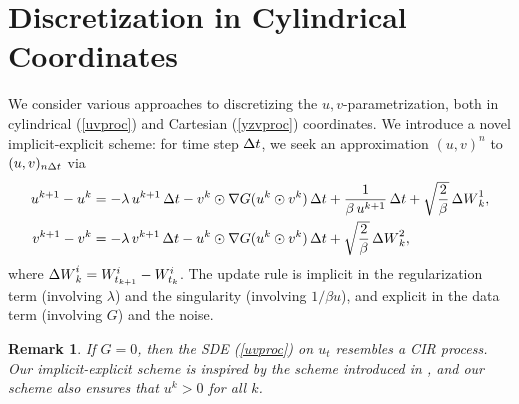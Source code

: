 \documentclass[11pt, twoside]{report}
\newtheorem{remark}{Remark}[theorem]
\begin{document}
\section{Discretization in Cylindrical Coordinates}
We consider various approaches to discretizing the $u,v$-parametrization, both in cylindrical (\ref{uvproc}) and Cartesian (\ref{yzvproc}) coordinates.
We introduce a novel implicit-explicit scheme: for time step ${\Delta t}$, we seek an approximation $(u,v)^n$ to $(u,v)_{n {\Delta t}}$ via
\begin{gather}
\begin{split}
u^{k+1}-u^k&=-\lambda\,   u^{k+1}\,{\Delta t} - v^k \odot\nabla G(u^k \odot v^k)\,
{\Delta t}
 +\frac{1}{\beta\, u^{k+1}}\,{\Delta t}+ \sqrt\frac{2}{\beta} \,{\Delta W}^1_{k},\\
v^{k+1}-v^k&=-\lambda\,  v^{k+1}\,{\Delta t} -  u^k\odot \nabla G(u^k \odot v^k)\,{\Delta t}+  \sqrt\frac{2}{\beta}\,{\Delta W}^2_k,
\label{discrete_scheme}
\end{split}
\end{gather}
where ${\Delta W}^i_k=W^i_{t_{k+1}}-W^i_{t_k}$. The update rule is implicit in the regularization term (involving $\lambda$) and the singularity (involving $1/\beta u$), and explicit in the data term (involving $G$) and the noise. 

\begin{remark}
If $G=0$, then the SDE (\ref{uvproc}) on $u_t$ resembles a CIR process. Our implicit-explicit scheme is inspired by the scheme introduced in \cite{Dereich2011-tp}, and our scheme also ensures that $u^k>0$ for all $k$.
\end{remark}
\end{document}
